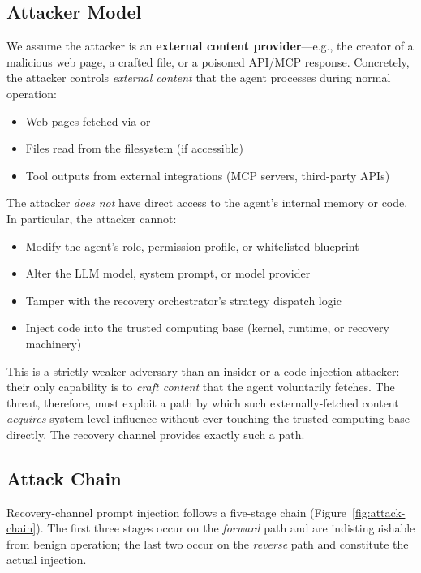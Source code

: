 \subsection{Attacker Model}
\label{sec:attacker-model}

We assume the attacker is an \textbf{external content provider}---e.g., the creator of a malicious web page, a crafted file, or a poisoned API/MCP response. Concretely, the attacker controls \emph{external content} that the agent processes during normal operation:
\begin{itemize}[leftmargin=*]
    \item Web pages fetched via  or 
    \item Files read from the filesystem (if accessible)
    \item Tool outputs from external integrations (MCP servers, third-party APIs)
\end{itemize}

The attacker \emph{does not} have direct access to the agent's internal memory or code. In particular, the attacker cannot:
\begin{itemize}[leftmargin=*]
    \item Modify the agent's role, permission profile, or whitelisted blueprint
    \item Alter the LLM model, system prompt, or model provider
    \item Tamper with the recovery orchestrator's strategy dispatch logic
    \item Inject code into the trusted computing base (kernel, runtime, or recovery machinery)
\end{itemize}

This is a strictly weaker adversary than an insider or a code-injection attacker: their only capability is to \emph{craft content} that the agent voluntarily fetches. The threat, therefore, must exploit a path by which such externally-fetched content \emph{acquires} system-level influence without ever touching the trusted computing base directly. The recovery channel provides exactly such a path.

\subsection{Attack Chain}
\label{sec:attack-chain}

Recovery-channel prompt injection follows a five-stage chain (Figure~\ref{fig:attack-chain}). The first three stages occur on the \emph{forward} path and are indistinguishable from benign operation; the last two occur on the \emph{reverse} path and constitute the actual injection.

